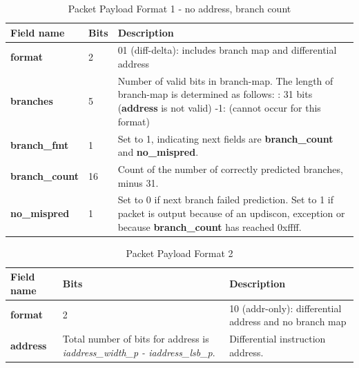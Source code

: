 \begin{table}[htp]
    \centering
    \caption{Packet Payload Format 1 - no address, branch count}
    \label{tab:te_inst0-1-noaddr-count}
    \begin{tabulary}{\textwidth}{|l|p{35mm}|p{80mm}|}
        \hline
        {\bf Field name} & {\bf Bits} & {\bf Description} \\
        \hline
        \textbf{format}	& 2	& 01 (diff-delta): includes branch map and differential address\\
        \hline
        \textbf{branches} & 5 & Number of valid bits in branch-map. The length of branch-map is determined as follows: :      31 bits (\textbf{address} is not valid) -1: 	(cannot occur for this format) \\
        \hline
        \textbf{branch\_fmt} & 1  & Set to 1, indicating next fields are \textbf{branch\_count} and \textbf{no\_mispred}. \\
        \hline
        \textbf{branch\_count} & 16 & Count of the number of correctly predicted	 branches, minus 31. \\
        \hline
        \textbf{no\_mispred} & 1 & 
                     Set to 0 if next branch failed prediction.  Set to 1 if packet is output because of an updiscon, 
                     exception or because \textbf{branch\_count} has reached 0xffff. \\
        \hline
    \end{tabulary}
\end{table}


\begin{table}[!h]
    \centering
    \caption{Packet Payload Format 2}
    \label{tab:te_inst2}
    \begin{tabulary}{\textwidth}{|l|p{35mm}|p{80mm}|}
        \hline
        {\bf Field name} & {\bf Bits} & {\bf Description} \\
        \hline
        \textbf{format}	& 2	& 10 (addr-only): differential address and no branch map\\
        \hline
        \textbf{address} & Total number of bits 
                  for address is
                  \textit {iaddress\_width\_p - iaddress\_lsb\_p}. & 
                  Differential instruction address.\\ 
        \hline
    \end{tabulary}
\end{table}

